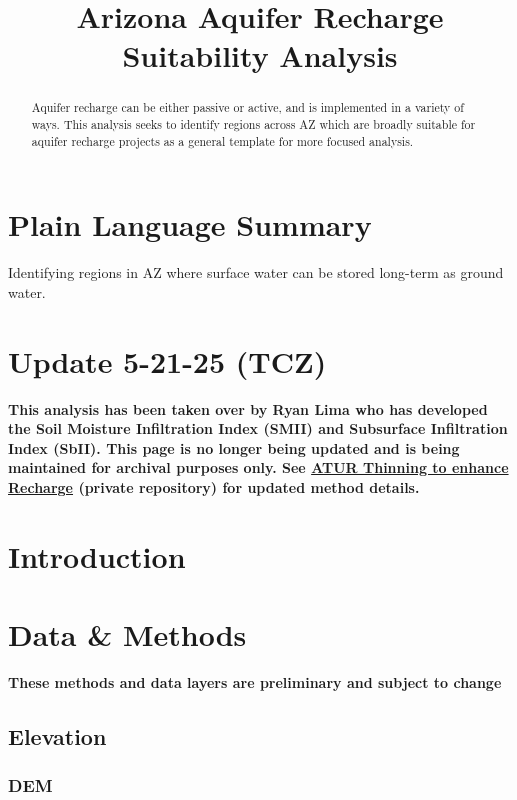 \documentclass[
]{agujournal2019}
\begin{document}
\title{Arizona Aquifer Recharge Suitability Analysis}



\begin{abstract}
Aquifer recharge can be either passive or active, and is implemented in
a variety of ways. This analysis seeks to identify regions across AZ
which are broadly suitable for aquifer recharge projects as a general
template for more focused analysis.
\end{abstract}

\section*{Plain Language Summary}
Identifying regions in AZ where surface water can be stored long-term as
ground water.




\section{Update 5-21-25 (TCZ)}\label{update-5-21-25-tcz}

\textbf{This analysis has been taken over by Ryan Lima who has developed
the Soil Moisture Infiltration Index (SMII) and Subsurface Infiltration
Index (SbII). This page is no longer being updated and is being
maintained for archival purposes only. See
\href{https://ryan3lima.github.io/ATUR-Thinning-to-enhance-recharge/}{ATUR
Thinning to enhance Recharge} (private repository) for updated method
details.}

\section{Introduction}\label{introduction}

\section{Data \& Methods}\label{sec-data-methods}

\textbf{These methods and data layers are preliminary and subject to
change}

\subsection{Elevation}\label{elevation}

\subsubsection{DEM}\label{dem}
\end{document}
